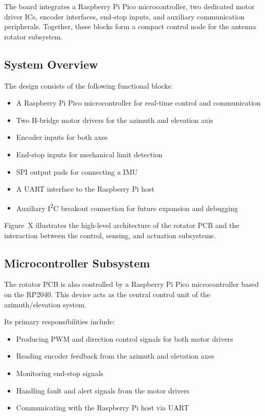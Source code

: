 The board integrates a Raspberry Pi Pico microcontroller, two dedicated motor driver ICs, encoder interfaces, end-stop inputs, and auxiliary communication peripherals. Together, these blocks form a compact control node for the antenna rotator subsystem.

\subsection{System Overview}
\label{subsec:rotator_system_overview}

The design consists of the following functional blocks:

\begin{itemize}
\item A Raspberry Pi Pico microcontroller for real-time control and communication
\item Two H-bridge motor drivers for the azimuth and elevation axis
\item Encoder inputs for both axes
\item End-stop inputs for mechanical limit detection
\item SPI output pads for connecting a IMU
\item A UART interface to the Raspberry Pi host
\item Auxiliary I\textsuperscript{2}C breakout connection for future expansion and debugging
\end{itemize}

Figure~X illustrates the high-level architecture of the rotator PCB and the interaction between the control, sensing, and actuation subsystems.

\subsection{Microcontroller Subsystem}
\label{subsec:rotator_microcontroller}

The rotator PCB is also controlled by a Raspberry Pi Pico microcontroller based on the RP2040. This device acts as the central control unit of the azimuth/elevation system.

Its primary responsibilities include:

\begin{itemize}
\item Producing PWM and direction control signals for both motor drivers
\item Reading encoder feedback from the azimuth and elevation axes
\item Monitoring end-stop signals
\item Handling fault and alert signals from the motor drivers
\item Communicating with the Raspberry Pi host via UART
\end{itemize}

